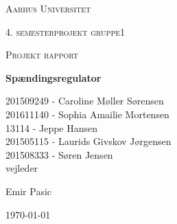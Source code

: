 \thispagestyle{empty}
	{\centering
	{\scshape\LARGE Aarhus Universitet \par}
	\vspace{1cm}
	{\scshape\Large 4. semesterprojekt gruppe1\par}
	{\scshape\Large Projekt rapport\par}
	\vspace{1.5cm}
	{\huge\bfseries Spændingsregulator\par}
	\vspace{2cm}
	{\Large
	201509249 - Caroline Møller Sørensen\\
	201611140 - Sophia Amailie Mortensen\\
	13114 - Jeppe Hansen\\ 
	201505115 - Laurids Givskov Jørgensen\\
	201508333 - Søren Jensen\\  }
	\vfill
	vejleder\par
	Emir Pasic

	\vfill

	{\large \today\par}
\par}

